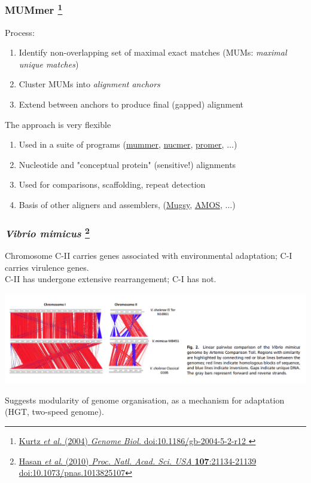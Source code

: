 %
\begin{frame}
  \frametitle{MUMmer
  \footnote{\tiny{\href{http://dx.doi.org/10.1186/gb-2004-5-2-r12
}{Kurtz \textit{et al.} (2004) \textit{Genome Biol.} doi:10.1186/gb-2004-5-2-r12
}}}
  }
  \textcolor{RawSienna}{Process:}
  \begin{enumerate}
    \item \textcolor{hutton_green}{Identify non-overlapping set of maximal exact matches (MUMs: \textit{maximal unique matches})}
    \item \textcolor{hutton_blue}{Cluster MUMs into \textit{alignment anchors}}
    \item \textcolor{hutton_purple}{Extend between anchors to produce final (gapped) alignment}    
  \end{enumerate}
  \textcolor{RawSienna}{The approach is very flexible}
  \begin{enumerate}
    \item Used in a suite of programs (\url{mummer}, \url{nucmer}, \url{promer}, $\ldots$)
    \item Nucleotide and "conceptual protein" (sensitive!) alignments
    \item Used for comparisons, scaffolding, repeat detection
    \item Basis of other aligners and assemblers, (\url{Mugsy}, \url{AMOS}, $\ldots$)
  \end{enumerate}
\end{frame}

\begin{frame}
  \frametitle{\textit{Vibrio mimicus} 
  \footnote{\tiny{\href{http://dx.doi.org/10.1073/pnas.1013825107}{Hasan \textit{et al}. (2010) \textit{Proc. Natl. Acad. Sci. USA} \textbf{107}:21134-21139 doi:10.1073/pnas.1013825107}}}
  }
  Chromosome C-II carries genes associated with environmental adaptation; C-I carries virulence genes.\\
  C-II has undergone extensive rearrangement; C-I has not.\\
  \begin{center}
    \includegraphics[width=1\textwidth]{images/v_mimicus}
  \end{center}    
  Suggests modularity of genome organisation, as a mechanism for adaptation (HGT, two-speed genome).
\end{frame}

